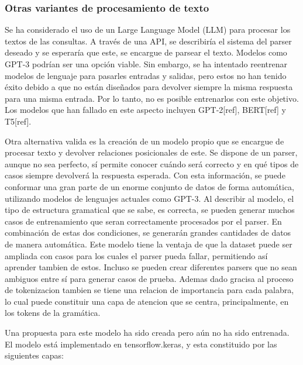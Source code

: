 \subsubsection*{Otras variantes de procesamiento de texto }
Se ha considerado el uso de un Large Language Model (LLM) para procesar los textos de las consultas. A través de una API, se describiría el sistema del parser deseado y se esperaría que este, se encargue de parsear el texto. Modelos como GPT-3 podrían ser una opción viable. Sin embargo, se ha intentado reentrenar modelos de lenguaje para pasarles entradas y salidas, pero estos no han tenido éxito debido a que no están diseñados para devolver siempre la misma respuesta para una misma entrada. Por lo tanto, no es posible entrenarlos con este objetivo. Los modelos que han fallado en este aspecto incluyen GPT-2[ref], BERT[ref] y T5[ref].

Otra alternativa valida es la creación de un modelo propio que se encargue de procesar texto y devolver relaciones posicionales de este. Se dispone de un parser, aunque no sea perfecto, sí permite conocer cuándo será correcto y en qué tipos de casos siempre devolverá la respuesta esperada. Con esta información, se puede conformar una gran parte de un enorme conjunto de datos de forma automática, utilizando modelos de lenguajes actuales como GPT-3. Al describir al modelo, el tipo de estructura gramatical que se sabe, es correcta, se pueden generar muchos casos de entrenamiento que seran correctamente procesados por el parser. En combinación de estas dos condiciones, se generarán grandes cantidades de datos de manera automática. Este modelo tiene la ventaja de que la dataset puede ser ampliada con casos para los cuales el parser pueda fallar, permitiendo así aprender tambien de estos. Incluso se pueden crear diferentes parsers que no sean ambiguos entre sí para generar casos de prueba. Ademas dado gracisa al proceso de tokenizacion tambien se tiene una relacion de importancia para cada palabra, lo cual puede constituir una capa de atencion que se centra, principalmente, en los tokens de la gram\'atica.

Una propuesta para este modelo ha sido creada pero aún no ha sido entrenada. El modelo está implementado en tensorflow.keras, y esta constituido por las siguientes capas:

